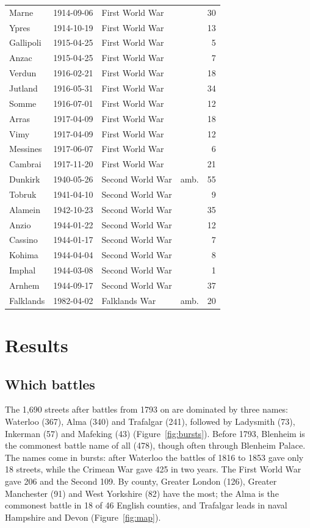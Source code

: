 \documentclass[11pt,a4paper]{article}
\begin{document}
\begin{small}
\begin{longtable}{llp{5.2cm}lr}
Marne & 1914-09-06 & First World War &  & 30\\
Ypres & 1914-10-19 & First World War &  & 13\\
Gallipoli & 1915-04-25 & First World War &  & 5\\
Anzac & 1915-04-25 & First World War &  & 7\\
Verdun & 1916-02-21 & First World War &  & 18\\
Jutland & 1916-05-31 & First World War &  & 34\\
Somme & 1916-07-01 & First World War &  & 12\\
Arras & 1917-04-09 & First World War &  & 18\\
Vimy & 1917-04-09 & First World War &  & 12\\
Messines & 1917-06-07 & First World War &  & 6\\
Cambrai & 1917-11-20 & First World War &  & 21\\
Dunkirk & 1940-05-26 & Second World War & amb. & 55\\
Tobruk & 1941-04-10 & Second World War &  & 9\\
Alamein & 1942-10-23 & Second World War &  & 35\\
Anzio & 1944-01-22 & Second World War &  & 12\\
Cassino & 1944-01-17 & Second World War &  & 7\\
Kohima & 1944-04-04 & Second World War &  & 8\\
Imphal & 1944-03-08 & Second World War &  & 1\\
Arnhem & 1944-09-17 & Second World War &  & 37\\
Falklands & 1982-04-02 & Falklands War & amb. & 20\\
\bottomrule\end{longtable}\end{small}

\section{Results}
\subsection{Which battles}
The 1,690 streets after battles from 1793 on are dominated by three names: Waterloo (367), Alma (340) and Trafalgar (241), followed by Ladysmith (73), Inkerman (57) and Mafeking (43) (Figure~\ref{fig:bursts}). Before 1793, Blenheim is the commonest battle name of all (478), though often through Blenheim Palace. The names come in bursts: after Waterloo the battles of 1816 to 1853 gave only 18 streets, while the Crimean War gave 425 in two years. The First World War gave 206 and the Second 109. By county, Greater London (126), Greater Manchester (91) and West Yorkshire (82) have the most; the Alma is the commonest battle in 18 of 46 English counties, and Trafalgar leads in naval Hampshire and Devon (Figure~\ref{fig:map}).
\end{document}
